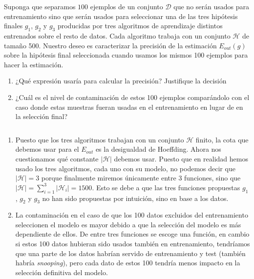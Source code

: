 \documentclass[11pt,leqno]{article}
\theoremstyle{definition}
\begin{document}
\begin{cuestion}
Suponga que separamos $100$ ejemplos de un conjunto $\mathcal{D}$ que no serán usados para entrenamiento sino que serán usados para seleccionar una de las tres hipótesis finales $g_1$, $g_2$ y $g_3$ producidas por tres algoritmos de aprendizaje distintos entrenados sobre el resto de datos.
Cada algoritmo trabaja con un conjunto $\mathcal{H}$ de tamaño 500. Nuestro deseo es caracterizar la precisión de la estimación $E_{out}(g)$ sobre la hipótesis final seleccionada cuando usamos los mismos 100 ejemplos para hacer la estimación.
\begin{enumerate}[a]
\item ¿Qué expresión usaría para calcular la precisión? Justifique la decisión
\item ¿Cuál es el nivel de contaminación de estos 100 ejemplos comparándolo con el caso donde estas muestras fueran usadas en el entrenamiento en lugar de en la selección final?
\end{enumerate}
\end{cuestion}

  \begin{solucion} $ $
  \begin{enumerate}[a]
  	\item Puesto que los tres algoritmos trabajan con un conjunto $\mathcal{H}$ finito, la cota que debemos usar para el $E_{out}$ es la desigualdad de Hoeffding. Ahora nos cuestionamos qué constante $|\mathcal{H}|$ debemos usar. Puesto que en realidad hemos usado los tres algoritmos, cada uno con su modelo, no podemos decir que $|\mathcal{H}|=3$ porque finalmente miremos únicamente entre 3 funciones, sino que $|\mathcal{H}| = \sum\limits_{i=1}^3 |\mathcal{H}_i| = 1500$. Esto se debe a que las tres funciones propuestas $g_1$, $g_2$ y $g_3$ no han sido propuestas por intuición, sino en base a los datos. 
  	\item La contaminación en el caso de que los 100 datos excluidos del entrenamiento seleccionen el modelo es mayor debido a que la selección del modelo es más dependiente de ellos. De entre tres funciones se escoge una función, en cambio si estos 100 datos hubieran sido usados también en entrenamiento, tendríamos que una parte de los datos habrían servido de entrenamiento y test (también habría \textit{snooping}), pero cada dato de estos 100 tendría menos impacto en la selección definitiva del modelo.
  \end{enumerate}
  \end{solucion}  
  
\end{document}
